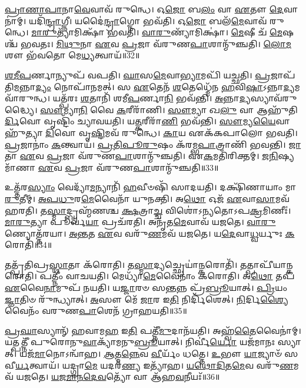 \-\ul{𑌪𑍍𑌰𑌾}\-\-\ul{𑌣𑌾}\-\-\ul{𑌪𑌾}\-𑌨𑌾\-\ul{𑌵𑍇}\-𑌵𑌾𑌵᳴ 𑌰𑍁𑌨𑍍𑌧𑍇।
𑌓\-\ul{𑌜𑍋} 𑌬\-\ul{𑌲𑌂} 𑌵𑌾 \ul{𑌏}\-𑌤𑍗 \ul{𑌦𑍇}\-𑌵𑌾𑌨𑌾॑𑌮𑍍।
𑌯𑌦𑌿᳴\-\ul{𑌨𑍍𑌦𑍍𑌰𑌾}\-𑌗𑍍𑌨𑍀।
𑌯𑌦𑍈॑\-\ul{𑌨𑍍𑌦𑍍𑌰𑌾}\-𑌗𑍍𑌨𑍋 𑌭𑌵᳴𑌤𑌿।
𑌓\-\ul{𑌜𑍋} 𑌬𑌲᳴\-\ul{𑌮𑍇}\-𑌵𑌾𑌵᳴ 𑌰𑍁𑌨𑍍𑌧𑍇।
\-\ul{𑌮𑌾}\-\-\ul{𑌰𑍁}\-𑌤𑍍𑌯𑌾᳴𑌮𑌿𑌕𑍍𑌷𑌾᳴ 𑌭𑌵𑌤𑌿।
\-\ul{𑌵𑌾}\-\-\ul{𑌰𑍁}\-𑌣𑍍𑌯𑌾᳴𑌮𑌿𑌕𑍍𑌷𑌾॑।
\-\ul{𑌮𑍇}\-𑌷𑍀 𑌚᳴ \ul{𑌮𑍇}\-𑌷𑌶𑍍𑌚᳴ 𑌭𑌵𑌤𑌃।
\-\ul{𑌮𑌿}\-\-\ul{𑌥𑍁}\-𑌨𑌾 \ul{𑌏}\-𑌵 \ul{𑌪𑍍𑌰}\-𑌜𑌾 𑌵᳴𑌰𑍁𑌣\-\ul{𑌪𑌾}\-𑌶𑌾𑌨𑍍𑌮𑍁᳴𑌞𑍍𑌚𑌤𑌿।
\-\ul{𑌲𑍋}\-\-\ul{𑌮}\-𑌶𑍗 𑌭᳴𑌵𑌤𑍋 𑌮𑍇\-\ul{𑌧𑍍𑌯}\-𑌤𑍍𑌵𑌾𑌯᳴॥32॥

\-\ul{𑌶}\-\-\ul{𑌮𑍀}\-\-\ul{𑌪}\-𑌰𑍍𑌣𑌾𑌨𑍍𑌯𑍁𑌪᳴ 𑌵𑌪𑌤𑌿।
\-\ul{𑌘𑌾}\-𑌸\-\ul{𑌮𑍇}\-𑌵𑌾\-\ul{𑌭𑍍𑌯𑌾}\-𑌮𑌪𑌿᳴ 𑌯𑌚𑍍𑌛𑌤𑌿।
\-\ul{𑌪𑍍𑌰}\-𑌜𑌾𑌪᳴𑌤𑌿\-\ul{𑌮}\-𑌨𑍍𑌨𑌾\-\ul{𑌦𑍍𑌯𑌂} 𑌨𑍋𑌪𑌾᳴𑌨𑌮𑌤𑍍।
𑌸 \ul{𑌏}\-𑌤𑍇𑌨᳴ \ul{𑌶}\-𑌤𑍇𑌧𑍍𑌮𑍇᳴𑌨 \ul{𑌹}\-𑌵𑌿\-\ul{𑌷𑌾}\-\-𑌽𑌨𑍍𑌨𑌾\-\ul{𑌦𑍍𑌯}\-𑌮𑌵𑌾᳴𑌰𑍁𑌨𑍍𑌧।
𑌯𑌤𑍍𑌪᳴𑌰𑌃 \ul{𑌶}\-𑌤𑌾𑌨𑌿᳴ 𑌶𑌮𑍀\-\ul{𑌪}\-𑌰𑍍𑌣𑌾\-\ul{𑌨𑌿} 𑌭𑌵᳴𑌨𑍍𑌤𑌿।
\-\ul{𑌅}\-𑌨𑍍𑌨𑌾\-\ul{𑌦𑍍𑌯}\-𑌸𑍍𑌯𑌾𑌵᳴𑌰𑍁𑌦𑍍𑌧𑍍𑌯𑍈।
\-\ul{𑌸𑍗}\-𑌮𑍍𑌯𑌾\-\ul{𑌨𑌿} 𑌵𑍈 \ul{𑌕}\-𑌰𑍀𑌰𑌾᳴𑌣𑌿।
\-\ul{𑌸𑍗}\-𑌮𑍍𑌯𑌾 𑌖\-\ul{𑌲𑍁} 𑌵𑌾 𑌆𑌹𑍁᳴𑌤𑌿\-\ul{𑌰𑍍𑌦𑌿}\-𑌵𑍋 𑌵𑍃𑌷𑍍𑌟𑌿𑌂᳴ 𑌚𑍍𑌯𑌾𑌵𑌯𑌤𑌿।
𑌯\-\ul{𑌤𑍍𑌕}\-𑌰𑍀𑌰𑌾᳴\-\ul{𑌣𑌿} 𑌭𑌵᳴𑌨𑍍𑌤𑌿।
\-\ul{𑌸𑍗}\-𑌮𑍍𑌯\-\ul{𑌯𑍈}\-𑌵𑌾𑌹𑍁᳴𑌤𑍍𑌯𑌾 \ul{𑌦𑌿}\-𑌵𑍋 𑌵𑍃\-\ul{𑌷𑍍𑌟𑌿}\-𑌮𑌵᳴ 𑌰𑍁𑌨𑍍𑌧𑍇।
\-\ul{𑌕𑌾}\-𑌯 𑌏𑌕᳴𑌕𑌪𑌾𑌲𑍋 𑌭𑌵𑌤𑌿।
\-\ul{𑌪𑍍𑌰}\-𑌜𑌾𑌨𑌾𑌂॑ \ul{𑌕}\-𑌨𑍍𑌤𑍍𑌵𑌾𑌯᳴।
\-\ul{𑌪𑍍𑌰}\-\-\ul{𑌤𑌿}\-\-\ul{𑌪𑍂}\-\-\ul{𑌰𑍁}\-𑌷𑌂 𑌕᳴𑌰𑌮𑍍𑌭\-\ul{𑌪𑌾}\-𑌤𑍍𑌰𑌾𑌣𑌿᳴ 𑌭𑌵𑌨𑍍𑌤𑌿।
\-\ul{𑌜𑌾}\-𑌤𑌾 \ul{𑌏}\-𑌵 \ul{𑌪𑍍𑌰}\-𑌜𑌾 𑌵᳴𑌰𑍁𑌣\-\ul{𑌪𑌾}\-𑌶𑌾𑌨𑍍𑌮𑍁᳴𑌞𑍍𑌚𑌤𑌿।
𑌏\-\ul{𑌕}\-𑌮𑌤𑌿᳴𑌰𑌿𑌕𑍍𑌤𑌮𑍍।
\-\ul{𑌜}\-\-\ul{𑌨𑌿}\-𑌷𑍍𑌯𑌮𑌾᳴𑌣𑌾 \ul{𑌏}\-𑌵 \ul{𑌪𑍍𑌰}\-𑌜𑌾 𑌵᳴𑌰𑍁𑌣\-\ul{𑌪𑌾}\-𑌶𑌾𑌨𑍍𑌮𑍁᳴𑌞𑍍𑌚𑌤𑌿॥33॥\anuvakamend[\-\ul{𑌨𑌿}\-\-\ul{𑌰𑍁}\-𑌪𑍍𑌯𑌨𑍍𑌤𑍇᳴ 𑌭𑌵\-\ul{𑌤𑍋} 𑌭𑌵᳴𑌤𑌿 𑌮𑍇\-\ul{𑌧𑍍𑌯}\-𑌤𑍍𑌵𑌾𑌯᳴ 𑌰𑍁\-\ul{𑌨𑍍𑌧𑍇} 𑌷𑌟𑍍𑌚᳴]

𑌉𑌤𑍍𑌤᳴𑌰\-\ul{𑌸𑍍𑌯𑌾𑌂} 𑌵𑍇𑌦𑍍𑌯𑌾᳴\-\ul{𑌮}\-𑌨𑍍𑌯𑌾𑌨𑌿᳴ \ul{𑌹}\-𑌵𑍀𑍞𑌷𑌿᳴ 𑌸𑌾𑌦𑌯𑌤𑌿।
𑌦𑌕𑍍𑌷𑌿᳴𑌣𑌾𑌯𑌾𑌂 𑌮𑌾\-\ul{𑌰𑍁}\-𑌤𑍀𑌮𑍍।
\-\ul{𑌅}\-\-\ul{𑌪}\-\-\ul{𑌧𑍁}\-𑌰\-\ul{𑌮𑍇}\-𑌵𑍈𑌨𑌾᳴ 𑌯𑍁𑌨𑌕𑍍𑌤𑌿।
𑌅\-\ul{𑌥𑍋} 𑌓𑌜᳴ \ul{𑌏}\-𑌵𑌾\-\ul{𑌸𑌾}\-𑌮𑌵᳴ 𑌹𑌰𑌤𑌿।
𑌤\-\ul{𑌸𑍍𑌮𑌾}\-𑌦𑍍𑌬𑍍𑌰𑌹𑍍𑌮᳴𑌣𑌶𑍍𑌚 \ul{𑌕𑍍𑌷}\-𑌤𑍍𑌰𑌾\-\ul{𑌚𑍍𑌚} 𑌵𑌿𑌶𑍋॑\-𑌽𑌨𑍍𑌯𑌤𑍋\-𑌽𑌪\-\ul{𑌕𑍍𑌰}\-𑌮𑌿𑌣𑍀𑌃॑।
\-\ul{𑌮𑌾}\-\-\ul{𑌰𑍁}\-𑌤𑍍𑌯𑌾 𑌪𑍂𑌰𑍍𑌵᳴\-\ul{𑌯𑌾} 𑌪𑍍𑌰𑌚᳴𑌰𑌤𑌿।
𑌅𑌨𑍃᳴𑌤\-\ul{𑌮𑍇}\-𑌵𑌾𑌵᳴ 𑌯𑌜𑌤𑍇।
\-\ul{𑌵𑌾}\-\-\ul{𑌰𑍁}\-𑌣𑍍𑌯𑍋𑌤𑍍𑌤᳴𑌰𑌯𑌾।
\-\ul{𑌅}\-\-\ul{𑌨𑍍𑌤}\-𑌤 \ul{𑌏}\-𑌵 𑌵𑌰𑍁᳴\-\ul{𑌣}\-𑌮𑌵᳴ 𑌯𑌜𑌤𑍇।
𑌯\-\ul{𑌦𑍇}\-𑌵𑌾\-\ul{𑌧𑍍𑌵}\-𑌰𑍍𑌯𑍁𑌃 \ul{𑌕}\-𑌰𑍋𑌤𑌿᳴॥34॥

𑌤𑌤𑍍𑌪𑍍𑌰᳴𑌤𑌿𑌪𑍍𑌰\-\ul{𑌸𑍍𑌥𑌾}\-𑌤𑌾 𑌕᳴𑌰𑍋𑌤𑌿।
𑌤\-\ul{𑌸𑍍𑌮𑌾}\-𑌦𑍍𑌯𑌚𑍍𑌛𑍍𑌰𑍇𑌯𑌾॑\-\ul{𑌨𑍍𑌕}\-𑌰𑍋𑌤𑌿᳴।
𑌤𑌤𑍍𑌪𑌾𑌪𑍀᳴\-𑌯𑌾𑌨𑍍𑌕𑌰𑍋𑌤𑌿।
𑌪𑌤𑍍𑌨𑍀𑌂॑ 𑌵𑌾𑌚𑌯𑌤𑌿।
𑌮𑍇𑌧𑍍𑌯𑌾᳴\-\ul{𑌮𑍇}\-𑌵𑍈𑌨𑌾𑌂॑ 𑌕𑌰𑍋𑌤𑌿।
𑌅\-\ul{𑌥𑍋} 𑌤𑌪᳴ \ul{𑌏}\-𑌵𑍈\-\ul{𑌨𑌾}\-𑌮𑍁𑌪᳴ 𑌨𑌯𑌤𑌿।
𑌯\-\ul{𑌜𑍍𑌜𑌾}\-𑌰𑍞 𑌸\-\ul{𑌨𑍍𑌤}\-𑌨𑍍𑌨 𑌪𑍍𑌰᳴\-\ul{𑌬𑍍𑌰𑍂}\-𑌯𑌾𑌤𑍍।
\-\ul{𑌪𑍍𑌰𑌿}\-𑌯𑌂 \ul{𑌜𑍍𑌞𑌾}\-𑌤𑌿𑍞 𑌰𑍁᳴𑌨𑍍𑌧𑍍𑌯𑌾𑌤𑍍।
\-\ul{𑌅}\-𑌸𑍗 𑌮𑍇᳴ \ul{𑌜𑌾}\-𑌰 𑌇\-\ul{𑌤𑌿} 𑌨𑌿𑌰𑍍𑌦𑌿᳴𑌶𑍇𑌤𑍍।
\-\ul{𑌨𑌿}\-𑌰𑍍𑌦𑌿\-\ul{𑌶𑍍𑌯𑍈}\-𑌵𑍈𑌨𑌂᳴ 𑌵𑌰𑍁𑌣\-\ul{𑌪𑌾}\-𑌶𑍇𑌨᳴ 𑌗𑍍𑌰𑌾𑌹𑌯𑌤𑌿॥35॥

\-\ul{𑌪𑍍𑌰}\-\-\ul{𑌘𑌾}\-𑌸𑍍𑌯𑌾𑌨𑍍᳴ 𑌹𑌵𑌾𑌮\-\ul{𑌹} 𑌇\-\ul{𑌤𑌿} 𑌪𑌤𑍍𑌨𑍀᳴\-\ul{𑌮𑍁}\-𑌦𑌾𑌨᳴𑌯𑌤𑌿।
𑌅𑌹𑍍𑌵᳴\-\ul{𑌤𑍈}\-𑌵𑍈𑌨𑌾॑𑌮𑍍।
𑌯𑌤𑍍𑌪𑌤𑍍𑌨𑍀᳴ 𑌪𑍁𑌰𑍋𑌨𑍁\-\ul{𑌵𑌾}\-𑌕𑍍𑌯𑌾᳴𑌮𑌨𑍁\-\ul{𑌬𑍍𑌰𑍂}\-𑌯𑌾𑌤𑍍।
𑌨𑌿𑌰𑍍𑌵𑍀॑\-\ul{𑌰𑍍𑌯𑍋} 𑌯𑌜᳴𑌮𑌾𑌨𑌃 𑌸𑍍𑌯𑌾𑌤𑍍।
𑌯𑌜᳴\-\ul{𑌮𑌾}\-𑌨𑍋\-𑌽𑌨𑍍𑌵𑌾᳴𑌹।
\-\ul{𑌆}\-𑌤𑍍𑌮\-\ul{𑌨𑍍𑌨𑍇}\-𑌵 \ul{𑌵𑍀}\-𑌰𑍍𑌯𑌂᳴ 𑌧𑌤𑍍𑌤𑍇।
\-\ul{𑌉}\-𑌭𑍗 \ul{𑌯𑌾}\-𑌜𑍍𑌯𑌾𑍞᳴ 𑌸𑌵𑍀\-\ul{𑌰𑍍𑌯}\-𑌤𑍍𑌵𑌾𑌯᳴।
𑌯𑌦𑍍𑌗𑍍𑌰𑌾\-\ul{𑌮𑍇} 𑌯𑌦𑌰᳴\-\ul{𑌣𑍍𑌯} 𑌇𑌤𑍍𑌯𑌾᳴𑌹।
\-\ul{𑌯}\-\-\ul{𑌥𑍋}\-\-\ul{𑌦𑌿}\-𑌤\-\ul{𑌮𑍇}\-𑌵 𑌵𑌰𑍁᳴\-\ul{𑌣}\-𑌮𑌵᳴ 𑌯𑌜𑌤𑍇।
\-\ul{𑌯}\-\-\ul{𑌜}\-\-\ul{𑌮𑌾}\-\-\ul{𑌨}\-\-\ul{𑌦𑍇}\-\-\ul{𑌵}\-𑌤𑍍𑌯𑍋᳴ 𑌵𑌾 𑌆᳴𑌹\-\ul{𑌵}\-𑌨𑍀𑌯𑌃᳴॥36॥

